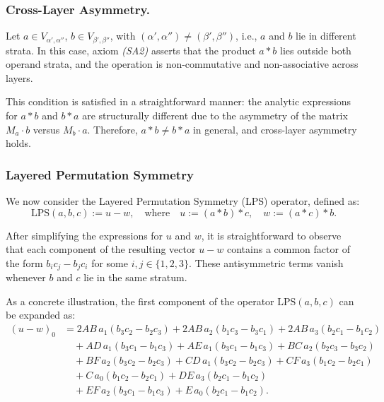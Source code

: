 \documentclass[12pt]{article}
\theoremstyle{definition}
\theoremstyle{plain}
\theoremstyle{remark}
\begin{document}
\subsubsection{Cross-Layer Asymmetry.}

Let \( a \in V_{\alpha', \alpha''} \), \( b \in V_{\beta', \beta''} \), with \( (\alpha', \alpha'') \ne (\beta', \beta'') \), i.e., \( a \) and \( b \) lie in different strata. In this case, axiom \emph{(SA2)} asserts that the product \( a * b \) lies outside both operand strata, and the operation is non-commutative and non-associative across layers.

This condition is satisfied in a straightforward manner: the analytic expressions for \( a * b \) and \( b * a \) are structurally different due to the asymmetry of the matrix \( M_a \cdot b \) versus \( M_b \cdot a \). Therefore, \( a * b \ne b * a \) in general, and cross-layer asymmetry holds.

\subsubsection{Layered Permutation Symmetry}

We now consider the Layered Permutation Symmetry (LPS) operator, defined as:
\[
\mathrm{LPS}(a, b, c) := u - w, \quad \text{where} \quad u := (a * b) * c, \quad w := (a * c) * b.
\]

After simplifying the expressions for \( u \) and \( w \), it is straightforward to observe that each component of the resulting vector \( u - w \) contains a common factor of the form \( b_i c_j - b_j c_i \) for some \( i, j \in \{1, 2, 3\} \). These antisymmetric terms vanish whenever \( b \) and \( c \) lie in the same stratum.

As a concrete illustration, the first component of the operator \( \mathrm{LPS}(a, b, c) \) can be expanded as:
\begin{align*}
(u - w)_0 &= 
2AB\, a_1 (b_3 c_2 - b_2 c_3) +
2AB\, a_2 (b_1 c_3 - b_3 c_1) +
2AB\, a_3 (b_2 c_1 - b_1 c_2) \\
&\quad + AD\, a_1 (b_3 c_1 - b_1 c_3) +
AE\, a_1 (b_3 c_1 - b_1 c_3) +
BC\, a_2 (b_2 c_3 - b_3 c_2) \\
&\quad + BF\, a_2 (b_3 c_2 - b_2 c_3) +
CD\, a_1 (b_3 c_2 - b_2 c_3) +
CF\, a_3 (b_1 c_2 - b_2 c_1) \\
&\quad + C\, a_0 (b_1 c_2 - b_2 c_1) +
DE\, a_3 (b_2 c_1 - b_1 c_2) \\
&\quad + EF\, a_2 (b_3 c_1 - b_1 c_3) +
E\, a_0 (b_2 c_1 - b_1 c_2).
\end{align*}
\end{document}
